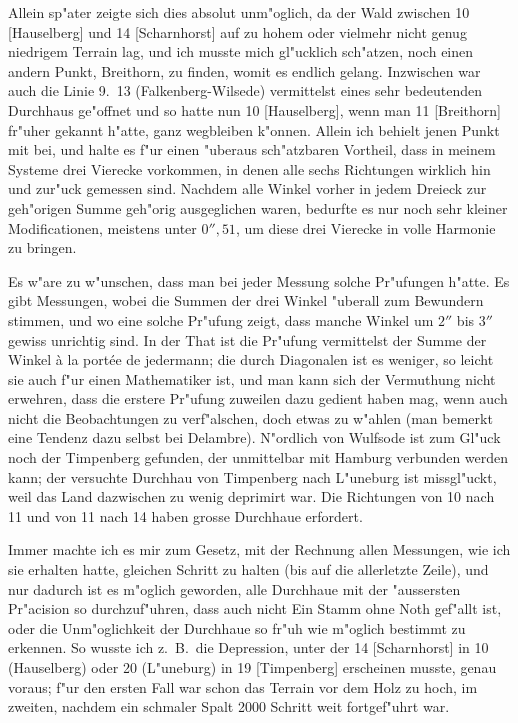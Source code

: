 \documentclass[12pt,a4paper]{article}
\theoremstyle{plain}
\theoremstyle{definition}
\theoremstyle{remark}
\begin{document}
Allein sp"ater zeigte sich dies absolut unm"oglich, da der Wald zwischen 10 [Hauselberg] und 14 [Scharnhorst] auf zu hohem oder vielmehr nicht genug niedrigem Terrain lag, und ich musste mich gl"ucklich sch"atzen, noch einen andern Punkt, Breithorn, zu finden, womit es endlich gelang. Inzwischen war auch die Linie 9.~13 (Falkenberg-Wilsede) vermittelst eines sehr bedeutenden Durchhaus ge"offnet und so hatte nun 10 [Hauselberg], wenn man 11 [Breithorn] fr"uher gekannt h"atte, ganz wegbleiben k"onnen. Allein ich behielt jenen Punkt mit bei, und halte es f"ur einen "uberaus sch"atzbaren Vortheil, dass in meinem Systeme drei Vierecke vorkommen, in denen alle sechs Richtungen wirklich hin und zur"uck gemessen sind. Nachdem alle Winkel vorher in jedem Dreieck zur geh"origen Summe geh"orig ausgeglichen waren, bedurfte es nur noch sehr kleiner Modificationen, meistens unter $0''\!\!\!,\!51$, um diese drei Vierecke in volle Harmonie zu bringen.

\newpage
\noindent Es w"are zu w"unschen, dass man bei jeder Messung solche Pr"ufungen h"atte. Es gibt Messungen, wobei die Summen der drei Winkel "uberall zum Bewundern stimmen, und wo eine solche Pr"ufung zeigt, dass manche Winkel um $2''$ bis $3''$ gewiss unrichtig sind. In der That ist die Pr"ufung vermittelst der Summe der Winkel \`{a} la port\'{e}e de jedermann; die durch Diagonalen ist es weniger, so leicht sie auch f"ur einen Mathematiker ist, und man kann sich der Vermuthung nicht erwehren, dass die erstere Pr"ufung zuweilen dazu gedient haben mag, wenn auch nicht die Beobachtungen zu verf"alschen, doch etwas zu w"ahlen (man bemerkt eine Tendenz dazu selbst bei Delambre). N"ordlich von Wulfsode ist zum Gl"uck noch der Timpenberg gefunden, der unmittelbar mit Hamburg verbunden werden kann; der versuchte Durchhau von Timpenberg nach L"uneburg ist missgl"uckt, weil das Land dazwischen zu wenig deprimirt war. Die Richtungen von 10 nach 11 und von 11 nach 14 haben grosse Durchhaue erfordert.

Immer machte ich es mir zum Gesetz, mit der Rechnung allen Messungen, wie ich sie erhalten hatte, gleichen Schritt zu halten (bis auf die allerletzte Zeile), und nur dadurch ist es m"oglich geworden, alle Durchhaue mit der "aussersten Pr"acision so durchzuf"uhren, dass auch nicht Ein Stamm ohne Noth gef"allt ist, oder die Unm"oglichkeit der Durchhaue so fr"uh wie m"oglich bestimmt zu erkennen. So wusste ich z.~B.\ die Depression, unter der 14 [Scharnhorst] in 10 (Hauselberg) oder 20 (L"uneburg) in 19 [Timpenberg] erscheinen musste, genau voraus; f"ur den ersten Fall war schon das Terrain vor dem Holz zu hoch, im zweiten, nachdem ein schmaler Spalt 2000 Schritt weit fortgef"uhrt war.
\end{document}
